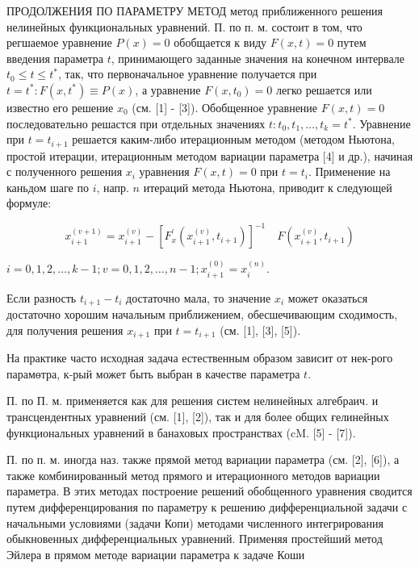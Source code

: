 \documentclass[10pt]{article}
\begin{document}
ПРОДОЛЖЕНИЯ ПО ПАРАМЕТРУ МЕТОД метод приближенного решения нелинейных функциональных уравнений. П. по п. м. состоит в том, что регшаемое уравнение $P(x)=0$ обобщается к виду $F(x, t)=0$ путем введения параметра $t$, принимающего заданные значения на конечном интервале $t_{0} \leqslant t \leqslant t^{*}$, так, что первоначальное уравнение получается при $t=t^{*}: F\left(x, t^{*}\right) \equiv P(x)$, а уравнение $F\left(x, t_{0}\right)=0$ легко решается или известно его решение $x_{0}$ (см. [1] - [3]). Обобщенное уравнение $F(x, t)=0$ последовательно решастся при отдельных значениях $t: t_{0}, t_{1}, \ldots, t_{k}=t^{*}$. Уравнение при $t=t_{i+1}$ решается каким-либо итерационным методом (методом Ньютона, простой итерации, итерационным методом вариации параметра [4] и др.), начиная с полученного решения $x_{i}$ уравнения $F(x, t)=0$ при $t=t_{i}$. Применение на каньдом шаге по $i$, напр. $n$ итераций метода Ньютона, приводит к следующей формуле:



\[

x_{i+1}^{(v+1)}=x_{i+1}^{(v)}-\left[F_{x}^{\prime}\left(x_{i+1}^{(v)}, t_{i+1}\right)\right]^{-1} \quad F\left(x_{i+1}^{(v)}, t_{i+1}\right)

\]



$i=0,1,2, \ldots, k-1 ; v=0,1,2, \ldots, n-1 ; x_{i+1}^{(0)}=x_{i}^{(n)}$.



Если разность $t_{i+1}-t_{i}$ достаточно мала, то значение $x_{i}$ может оказаться достаточно хорошим начальным приближением, обесшечивающим сходимость, для получения решения $x_{i+1}$ при $t=t_{i+1}$ (см. [1], [3], [5]).



На практике часто исходная задача естественным образом зависит от нек-рого парамөтра, к-рый может быть выбран в качестве параметра $t$.



П. по П. м. применяется как для решения систем нелинейных алгебраич. и трансцендентных уравнений (см. [1], [2]), так и для более общих ғелинейных функциональных уравнений в банаховых пространствах (cM. [5] - [7]).



П. по п. м. иногда наз. также прямой метод вариации параметра (см. [2], [6]), а также комбинированный метод прямого и итерационного методов вариации параметра. В этих методах построение решений обобщенного уравнения сводится путем дифференцирования по параметру к решению дифференциальной задачи с начальными условиями (задачи Копи) методами численного интегрирования обыкновенных дифференциальных уравнений. Применяя простейший метод Эйлера в прямом методе вариации параметра к задаче Коши
\end{document}

